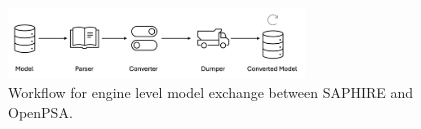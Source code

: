 \begin{figure}[H]
    \centering
    \includegraphics[width=0.7\textwidth]{3_identifying_gaps/benchmarking/datasets/figures/mef_workflow.png}
    \caption{Workflow for engine level model exchange between SAPHIRE and OpenPSA.}
    \label{fig:mef_workflow}
\end{figure}
